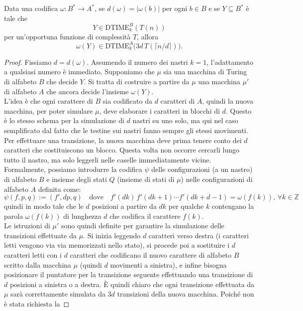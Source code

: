 \begin{lemm}\label{lem:codifica-blocchi}
Data una codifica $\omega\colon B^* \to A^*$, se $ d(\omega)=|\omega (b)|$ per ogni $b \in B$ e se $Y \subseteq B^*$ è
tale che
\[
  Y \in \mathrm{DTIME}^B_k(T(n))
\]
per un'opportuna funzione di complessità $T$, allora
\[
  \omega(Y) \in \mathrm{DTIME}^A_k\big(3d\,T(\lceil n/d \rceil)\big).
\]
\begin{proof}Fissiamo $d = d(\omega)$.
Assumendo il numero dei nastri $k=1$, l'adattamento a qualsiasi numero è immediato.
Supponiamo che $\mu$ sia una macchina di Turing di alfabeto $B$ che decide $Y$. Si tratta
di costruire a partire da $\mu$ una macchina $\mu'$ di alfabeto $A$ che ancora decide
l'insieme $\omega(Y)$.
\\
L'idea è che ogni carattere di $B$ sia codificato da $d$ caratteri di $A$, quindi la nuova
macchina, per poter simulare $\mu$, deve elaborare i caratteri in blocchi di $d$. Questo è
lo stesso schema per la simulazione di $d$ nastri su uno solo, ma qui nel caso semplificato
dal fatto che le testine sui nastri fanno sempre gli stessi movimenti.
Per effettuare una transizione, la nuova macchina deve prima tenere conto dei $d$ caratteri
che costituiscono un blocco. 
Questa volta non occorre cercarli lungo tutto il nastro, ma
solo leggerli nelle caselle immediatamente vicine. Formalmente, possiamo introdurre la
codifica $\psi$ delle configurazioni (a un nastro) di alfabeto $B$ e insieme degli stati $Q$
(insieme di stati di $\mu$) nelle configurazioni di alfabeto $A$ definita come:
\[
  \psi(f,p,q) := (f', dp, q)
  \quad\text{dove}\quad
  f'(dk)\,f'(dk+1)\cdots f'(dk+d-1) = \omega(f(k)), \, \forall k \in \mathbb Z
\]
quindi in modo tale che le $d$ posizioni a partire da $dk$ per qualche $k$ contengano la
parola $\omega(f(k))$ di lunghezza $d$ che codifica il carattere $f(k)$.
\\
Le istruzioni di $\mu'$ sono quindi definite per garantire la simulazione delle transizioni
effettuate da $\mu$. 
Si inizia leggendo $d$ caratteri verso destra 
(i caratteri letti
vengono via via memorizzati nello stato), 
si procede poi a sostituire i 
$d$ caratteri letti
con i $d$ caratteri che 
codificano il nuovo carattere di alfabeto $B$ scritto dalla macchina
$\mu$ 
(quindi $d$ movimenti a sinistra), 
e infine bisogna posizionare il 
puntatore per la
transizione seguente effettuando 
una transizione di $d$ posizioni a 
sinistra o a destra.
È quindi chiaro che ogni 
transizione effettuata da 
$\mu$ sarà correttamente simulata da
$3d$ transizioni della nuova macchina. 
Poiché non è stata richiesta la 

\end{proof}
\end{lemm}
